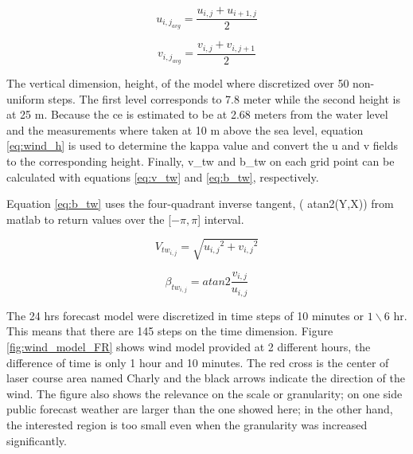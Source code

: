 \begin{equation} \label{eq:hor_AVG_velu}
    u_{{i,j}_{avg}}=\frac{ u_{i,j} + u_{{i+1},j} } {2}
\end{equation}

\begin{equation} \label{eq:hor_AVG_velv}
    v_{{i,j}_{avg}}=\frac{ v_{i,j} + v_{i,{j+1}} } {2}
\end{equation}

The vertical dimension, height, of the model where discretized over 50 non-uniform steps. The first level corresponds to 7.8 meter while the second height is at 25 m. Because the \acrshort{ce} is estimated to be at 2.68 meters from the water level \cite{pennanen2015optimal} and the measurements where taken at 10 m above the sea level, equation \ref{eq:wind_h} is used to determine the \acrshort{kappa} value and convert the \acrshort{u} and \acrshort{v} fields to the corresponding height. Finally, \acrshort{v_tw} and \acrshort{b_tw} on each grid point can be calculated with equations \ref{eq:v_tw} and \ref{eq:b_tw}, respectively. \par \noindent Equation \ref{eq:b_tw} uses the four-quadrant inverse tangent, ( atan2(Y,X)) from \acrshort{matlab} to return values over the [$- \pi, \pi  $] interval.%

\begin{equation}\label{eq:v_tw}
    V_{tw_{i,j}}=\sqrt{{u_{i,j}}^2+{v_{i,j}}^2}
\end{equation}

\begin{equation}\label{eq:b_tw}
    \beta_{tw_{i,j}}= atan2 \frac {v_{i,j}}{u_{i,j}}
\end{equation}

The 24 hrs forecast model were discretized in time steps of 10 minutes or ${1} \backslash {6}$ hr. This means that there are 145 steps on the time dimension. Figure \ref{fig:wind_model_FR} shows wind model provided at 2 different hours, the difference of time is only 1 hour and 10 minutes. The red cross is the center of laser course area named Charly and the black arrows indicate the direction of the wind. The figure also shows the relevance on the scale or granularity; on one side public forecast weather are larger than the one showed here; in the other hand, the interested region is too small even when the granularity was increased significantly. \par    

